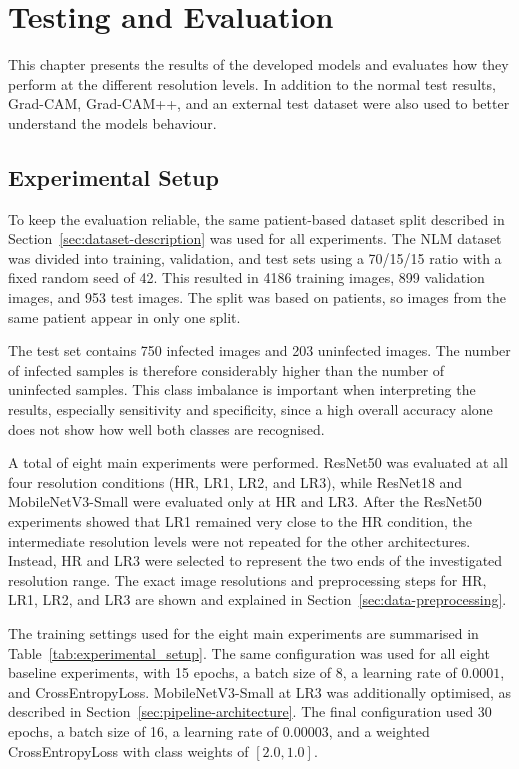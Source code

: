 \chapter{Testing and Evaluation}
\label{chap:testing}

This chapter presents the results of the developed models and evaluates how they perform at the different resolution levels. In addition to the normal test results, Grad-CAM, Grad-CAM++, and an external test dataset were also used to better understand the models behaviour.

\section{Experimental Setup}

To keep the evaluation reliable, the same patient-based dataset split described in Section~\ref{sec:dataset-description} was used for all experiments. The NLM dataset was divided into training, validation, and test sets using a 70/15/15 ratio with a fixed random seed of 42. This resulted in 4186 training images, 899 validation images, and 953 test images. The split was based on patients, so images from the same patient appear in only one split. 

The test set contains 750 infected images and 203 uninfected images. The number of infected samples is therefore considerably higher than the number of uninfected samples. This class imbalance is important when interpreting the results, especially sensitivity and specificity, since a high overall accuracy alone does not show how well both classes are recognised.

A total of eight main experiments were performed. ResNet50 was evaluated at all four resolution conditions (HR, LR1, LR2, and LR3), while ResNet18 and MobileNetV3-Small were evaluated only at HR and LR3. After the ResNet50 experiments showed that LR1 remained very close to the HR condition, the intermediate resolution levels were not repeated for the other architectures. Instead, HR and LR3 were selected to represent the two ends of the investigated resolution range. The exact image resolutions and preprocessing steps for HR, LR1, LR2, and LR3 are shown and explained in Section~\ref{sec:data-preprocessing}.

The training settings used for the eight main experiments are summarised in Table~\ref{tab:experimental_setup}. The same configuration was used for all eight baseline experiments, with 15 epochs, a batch size of 8, a learning rate of \(0.0001\), and CrossEntropyLoss. MobileNetV3-Small at LR3 was additionally optimised, as described in Section~\ref{sec:pipeline-architecture}. The final configuration used 30 epochs, a batch size of 16, a learning rate of \(0.00003\), and a weighted CrossEntropyLoss with class weights of \([2.0,1.0]\).

